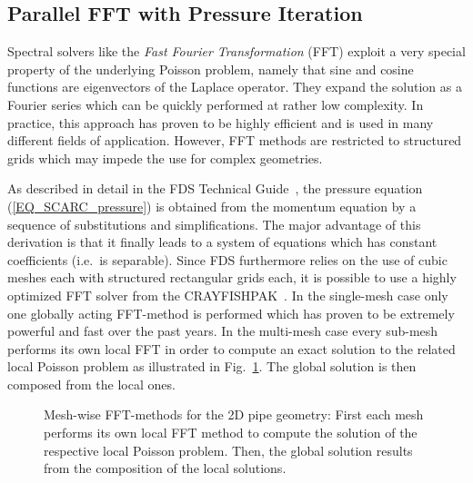  

\subsection{Parallel FFT with Pressure Iteration}
\label{SEC_SCARC_fft_solver}

Spectral solvers like the {\it Fast Fourier Transformation} (FFT) exploit a very special property of the underlying Poisson problem, namely that sine and cosine functions are eigenvectors of the Laplace operator. They expand the solution as a Fourier series which can be quickly performed at rather low complexity. In practice, this approach has proven to be highly efficient and is used in many different fields of application. However, FFT methods are restricted to structured grids which may impede the use for complex geometries.

As described in detail in the FDS Technical Guide~\cite{McGrattan:2018:TG}, the pressure equation (\ref{EQ_SCARC_pressure}) is obtained from the momentum equation by a sequence of substitutions and simplifications. The major advantage of this derivation is that it finally leads to a system of equations which has constant coefficients (i.e.\ is separable). 
Since FDS furthermore relies on the use of cubic meshes each with structured rectangular grids each, it is possible to use a highly optimized FFT solver from the CRAYFISHPAK~\cite{Sweet::Crayfishpak}.
%
In the single-mesh case only one globally acting FFT-method is performed which has proven to be extremely powerful and fast over the past years. 
In the multi-mesh case every sub-mesh performs its own local FFT in order to compute an exact solution to the related local Poisson problem as illustrated in Fig.~\ref{FIG_SCARC_local_ffts}. The global solution is then composed from the local ones.
\begin{figure}[ht]
\begin{center}

\caption[Mesh-wise FFT-methods]{Mesh-wise FFT-methods for the 2D pipe geometry: First each mesh performs its own local FFT method to compute the solution of the respective local Poisson problem. Then, the global solution results from the composition of the local solutions.}
\label{FIG_SCARC_local_ffts}
\end{center}
\end{figure}

